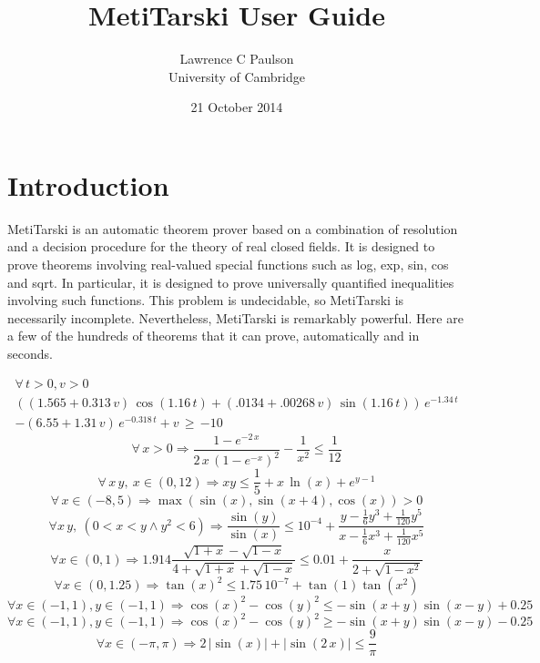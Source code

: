 \documentclass[a4paper,11pt]{scrartcl}
\title{MetiTarski User Guide}
\date{21 October 2014}
\author{Lawrence C Paulson \\ University of Cambridge}
\begin{document}
\maketitle
\section{Introduction}
  MetiTarski is an automatic theorem prover based on a combination of resolution and a decision procedure  for the theory of real closed fields. It is designed to prove theorems involving real-valued special functions such as log, exp, sin, cos and sqrt.   In particular, it is designed to prove universally quantified inequalities involving such  functions. This problem is undecidable, so MetiTarski is necessarily incomplete. Nevertheless, MetiTarski is remarkably powerful. Here are a few of the hundreds of theorems that it can prove, automatically and in seconds.

\begin{multline*}
\forall\, t > 0, v > 0\\
((1.565 + 0.313\,v)\,\cos(1.16\,t) + (.0134 + .00268\,v)\,\sin(1.16\,t))\,e^{-1.34\,t}\\
- (6.55 + 1.31\,v)\,e^{-0.318\,t} + v \,\geq\, {-10}
\end{multline*}
\[ \forall\, x > 0 \Longrightarrow \frac{1 - e^{-2\, x}}{2\,x\,(1 - e^{-x})^2} - \frac{1}{x^2} \leq \frac{1}{12}
\]
\[\forall\, x\, y,\ x \in (0, 12)\Longrightarrow
      x y \leq \frac{1}{5} + x\,\ln(x) + e^{y-1}
\]
\[\forall\,x \in (-8,5)\Longrightarrow \max(\sin(x), \sin(x + 4), \cos(x)) > 0
\]
\[\forall x\, y ,\  (0<x < y \land y^2 < 6) \Longrightarrow \frac{\sin(y)}{\sin(x)} \leq 10^{-4} + \frac{y - \frac{1}{6}y^3 + \frac{1}{120}y^5}{x - \frac{1}{6}x^3 + \frac{1}{120}x^5}
\]
\[\forall x \in (0, 1)\Longrightarrow 1.914 \frac{\sqrt{1+x} - \sqrt{1-x}}{4 + \sqrt{1+x} + \sqrt{1-x}} \leq 0.01 + \frac{x}{2+\sqrt{1-x^2}}
\]
\[\forall x \in (0, 1.25) \Longrightarrow \tan(x)^2 \leq 1.75\, 10^{-7} + \tan(1)\tan(x^2)
\]
\[\forall x \in (-1, 1), y \in (-1, 1) \Longrightarrow \cos(x)^2 - \cos(y)^2 \leq -\sin(x+y)\sin(x-y) + 0.25
\]
\[\forall x \in (-1, 1), y \in (-1, 1) \Longrightarrow \cos(x)^2 - \cos(y)^2 \geq -\sin(x+y)\sin(x-y) - 0.25
\]
\[\forall x \in (-\pi, \pi) \Longrightarrow 2\,|\sin(x)| + |\sin(2\,x)| \leq \frac{9}{\pi}
\]
%
\end{document}
